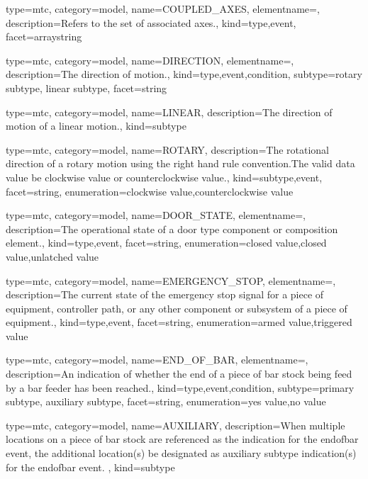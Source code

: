 {
  type=mtc,
  category=model,
  name={COUPLED\_AXES},
  elementname=,
  description={Refers to the set of associated axes.},
  kind={type,event},
  facet={\gls{arraystring}}
}


{
  type=mtc,
  category=model,
  name={DIRECTION},
  elementname=,
  description={The direction of motion.},
  kind={type,event,condition},
  subtype={\gls{rotary subtype}, \gls{linear subtype}},
  facet={\gls{string}}
}


{
  type=mtc,
  category=model,
  name={LINEAR},
  description={The direction of motion of a linear motion.},
  kind={subtype}
}


{
  type=mtc,
  category=model,
  name={ROTARY},
  description={The rotational direction of a rotary motion using the right hand rule convention.\newline The \gls{valid data value} \must be \gls{clockwise value} or \gls{counterclockwise value}.},
  kind={subtype,event},
  facet={\gls{string}},
  enumeration={\gls{clockwise value},\gls{counterclockwise value}}
}


{
  type=mtc,
  category=model,
  name={DOOR\_STATE},
  elementname=,
  description={The operational state of a \gls{door} type component or composition element.},
  kind={type,event},
  facet={\gls{string}},
  enumeration={\gls{closed value},\gls{closed value},\gls{unlatched value}}
}


{
  type=mtc,
  category=model,
  name={EMERGENCY\_STOP},
  elementname=,
  description={The current state of the emergency stop signal for a piece of equipment, controller path, or any other component or subsystem of a piece of equipment.},
  kind={type,event},
  facet={\gls{string}},
  enumeration={\gls{armed value},\gls{triggered value}}
}


{
  type=mtc,
  category=model,
  name={END\_OF\_BAR},
  elementname=,
  description={An indication of whether the end of a piece of bar stock being feed by a bar feeder has been reached.},
  kind={type,event,condition},
  subtype={\gls{primary subtype}, \gls{auxiliary subtype}},
  facet={\gls{string}},
  enumeration={\gls{yes value},\gls{no value}}
}


{
  type=mtc,
  category=model,
  name={AUXILIARY},
  description={When multiple locations on a piece of bar stock are referenced as the indication for the \gls{endofbar event}, the additional location(s) \must be designated as \gls{auxiliary subtype} indication(s) for the \gls{endofbar event}.  },
  kind={subtype}
}


